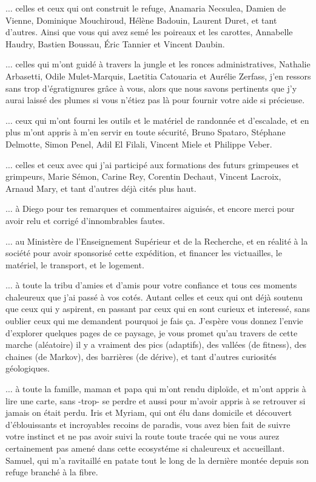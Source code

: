 $\hdots$ celles et ceux qui ont construit le refuge, Anamaria Necsulea, Damien de Vienne, Dominique Mouchiroud, Hélène Badouin, Laurent Duret, et tant d’autres.
Ainsi que vous qui avez semé les poireaux et les carottes, Annabelle Haudry, Bastien Boussau, Éric Tannier et Vincent Daubin.

$\hdots$ celles qui m’ont guidé à travers la jungle et les ronces administratives, Nathalie Arbasetti, Odile Mulet-Marquis, Laetitia Catouaria et Aurélie Zerfass, j’en ressors sans trop d'égratignures grâce à vous, alors que nous savons pertinents que j’y aurai laissé des plumes si vous n’étiez pas là pour fournir votre aide si précieuse.

$\hdots$ ceux qui m’ont fourni les outils et le matériel de randonnée et d’escalade, et en plus m’ont appris à m’en servir en toute sécurité, Bruno Spataro, Stéphane Delmotte, Simon Penel, Adil El Filali, Vincent Miele et Philippe Veber.

$\hdots$ celles et ceux avec qui j’ai participé aux formations des futurs grimpeuses et grimpeurs, Marie Sémon, Carine Rey, Corentin Dechaut, Vincent Lacroix, Arnaud Mary, et tant d’autres déjà cités plus haut.

$\hdots$ à Diego pour tes remarques et commentaires aiguisés, et encore merci pour avoir relu et corrigé d’innombrables fautes.

$\hdots$ au Ministère de l’Enseignement Supérieur et de la Recherche, et en réalité à la société pour avoir sponsorisé cette expédition, et financer les victuailles, le matériel, le transport, et le logement.

$\hdots$ à toute la tribu d'amies et d'amis pour votre confiance et tous ces moments chaleureux que j'ai passé à vos cotés.
Autant celles et ceux qui ont déjà soutenu que ceux qui y aspirent, en passant par ceux qui en sont curieux et interessé, sans oublier ceux qui me demandent pourquoi je fais ça.
J'espère vous donnez l'envie d'explorer quelques pages de ce paysage, je vous promet qu'au travers de cette marche (aléatoire) il y a vraiment des pics (adaptifs), des vallées (de fitness), des chaines (de Markov), des barrières (de dérive), et tant d'autres curiosités géologiques.

$\hdots$ à toute la famille, maman et papa qui m’ont rendu diploïde, et m’ont appris à lire une carte, sans -trop- se perdre et aussi pour m’avoir appris à se retrouver si jamais on était perdu.
Iris et Myriam, qui ont élu dans domicile et découvert d'éblouissants et incroyables recoins de paradis, vous avez bien fait de suivre votre instinct et ne pas avoir suivi la route toute tracée qui ne vous aurez certainement pas amené dans cette ecosystéme si chaleureux et accueillant.
Samuel, qui m’a ravitaillé en patate tout le long de la dernière montée depuis son refuge branché à la fibre.

